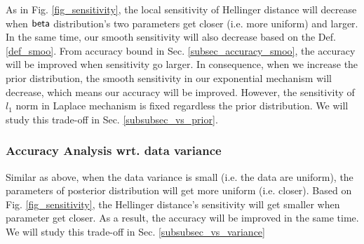 \documentclass[sigconf]{acmart}
\begin{document}
As in Fig. \ref{fig_sensitivity}, the local sensitivity of Hellinger distance will decrease when $\mathsf{beta}$ distribution's two parameters get closer (i.e. more uniform) and larger. In the same time, our smooth sensitivity will also decrease based on the Def. \ref{def_smoo}. From accuracy bound in Sec. \ref{subsec_accuracy_smoo}, the accuracy will be improved when sensitivity go larger. In consequence, when we increase the prior distribution, the smooth sensitivity in our exponential mechanism will decrease, which means our accuracy will be improved. However, the sensitivity of $l_1$ norm in Laplace mechanism is fixed regardless the prior distribution. We will study this trade-off in Sec. \ref{subsubsec_vs_prior}.

\subsubsection{Accuracy Analysis wrt. data variance}

Similar as above, when the data variance is small (i.e. the data are uniform), the parameters of posterior distribution will get more uniform (i.e. closer). Based on Fig. \ref{fig_sensitivity}, the Hellinger distance's sensitivity will get smaller when parameter get closer. As a result, the accuracy will be improved in the same time. We will study this trade-off in Sec. \ref{subsubsec_vs_variance}




\end{document}
